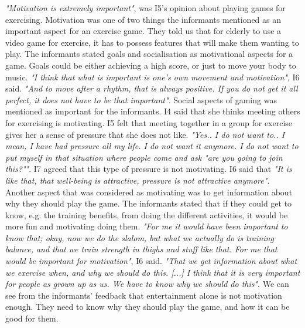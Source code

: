 \emph{"Motivation is extremely important"}, was I5's opinion about playing games for exercising. Motivation was one of two things the informants mentioned as an important aspect for an exercise game. They told us that for elderly to use a video game for exercise, it has to possess features that will make them wanting to play. The informants stated goals and socialisation as motivational aspects for a game. Goals could be either achieving a high score, or just to move your body to music. \emph{"I think that what is important is one's own movement and motivation"}, I6 said. \emph{"And to move after a rhythm, that is always positive. If you do not get it all perfect, it does not have to be that important"}. Social aspects of gaming was mentioned as important for the informants. I4 said that she thinks meeting others for exercising is motivating. I5 felt that meeting together in a group for exercise gives her a sense of pressure that she does not like. \emph{"Yes.. I do not want to.. I mean, I have had pressure all my life. I do not want it anymore. I do not want to put myself in that situation where people come and ask "are you going to join this?""}. I7 agreed that this type of pressure is not motivating. I6 said that \emph{"It is like that, that well-being is attractive, pressure is not attractive anymore"}.  Another aspect that was considered as motivating was to get information about why they should play the game. The informants stated that if they could get to know, e.g. the training benefits, from doing the different activities, it would be more fun and motivating doing them. \emph{"For me it would have been important to know that; okay, now we do the slalom, but what we actually do is training balance, and that we train strength in thighs and stuff like that. For me that would be important for motivation"}, I6 said. \emph{"That we get information about what we exercise when, and why we should do this. [...] I think that it is very important for people as grown up as us. We have to know why we should do this"}. We can see from the informants' feedback that entertainment alone is not motivation enough. They need to know why they should play the game, and how it can be good for them. 

